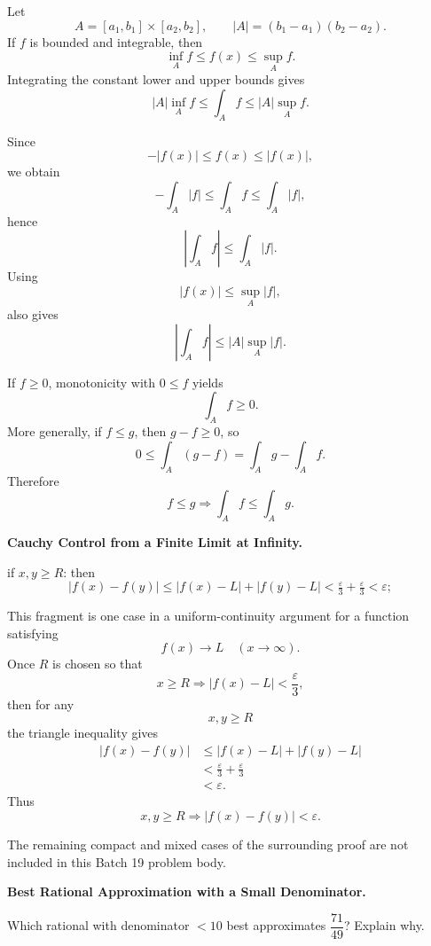 \begin{solution}
Let
\[
A=[a_1,b_1]\times[a_2,b_2],
\qquad
|A|=(b_1-a_1)(b_2-a_2).
\]
If \(f\) is bounded and integrable, then
\[
\inf_A f
\le
f(x)
\le
\sup_A f.
\]
Integrating the constant lower and upper bounds gives
\[
\boxed{
|A|\inf_A f
\le
\int_A f
\le
|A|\sup_A f.
}
\]

Since
\[
-|f(x)|
\le
f(x)
\le
|f(x)|,
\]
we obtain
\[
-\int_A|f|
\le
\int_A f
\le
\int_A|f|,
\]
hence
\[
\boxed{
\left|\int_Af\right|
\le
\int_A|f|.
}
\]
Using
\[
|f(x)|
\le
\sup_A|f|,
\]
also gives
\[
\boxed{
\left|\int_Af\right|
\le
|A|\sup_A|f|.
}
\]

If \(f\ge0\), monotonicity with \(0\le f\) yields
\[
\boxed{\int_Af\ge0.}
\]
More generally, if \(f\le g\), then \(g-f\ge0\), so
\[
0\le\int_A(g-f)
=
\int_Ag-\int_Af.
\]
Therefore
\[
\boxed{
f\le g
\Longrightarrow
\int_Af\le\int_Ag.
}
\]
\end{solution}


\begin{problem}[CP-II-0553]
\label{prob:cp-ii-0553}
\textbf{Cauchy Control from a Finite Limit at Infinity.}

\hspace*{1.5em}if $x,y\ge R$: then
	\[
	\lvert f(x)-f(y)\rvert
	\le \lvert f(x)-L\rvert+\lvert f(y)-L\rvert
	< \tfrac{\varepsilon}{3}+\tfrac{\varepsilon}{3}
	< \varepsilon;
	\]
\end{problem}

\begin{solution}
This fragment is one case in a uniform-continuity argument for a function satisfying
\[
f(x)\to L
\quad(x\to\infty).
\]
Once \(R\) is chosen so that
\[
x\ge R
\Longrightarrow
|f(x)-L|<\frac{\varepsilon}{3},
\]
then for any
\[
x,y\ge R
\]
the triangle inequality gives
\[
\begin{aligned}
|f(x)-f(y)|
&\le
|f(x)-L|+|f(y)-L|\\
&<
\frac{\varepsilon}{3}
+
\frac{\varepsilon}{3}\\
&<
\varepsilon.
\end{aligned}
\]
Thus
\[
\boxed{
x,y\ge R
\Longrightarrow
|f(x)-f(y)|<\varepsilon.
}
\]

The remaining compact and mixed cases of the surrounding proof are not included in this
Batch 19 problem body.
\end{solution}


\begin{problem}[CP-II-0555]
\label{prob:cp-ii-0555}
\textbf{Best Rational Approximation with a Small Denominator.}

	Which rational with denominator $<10$ best approximates $\dfrac{71}{49}$?  Explain why.
\end{problem}

